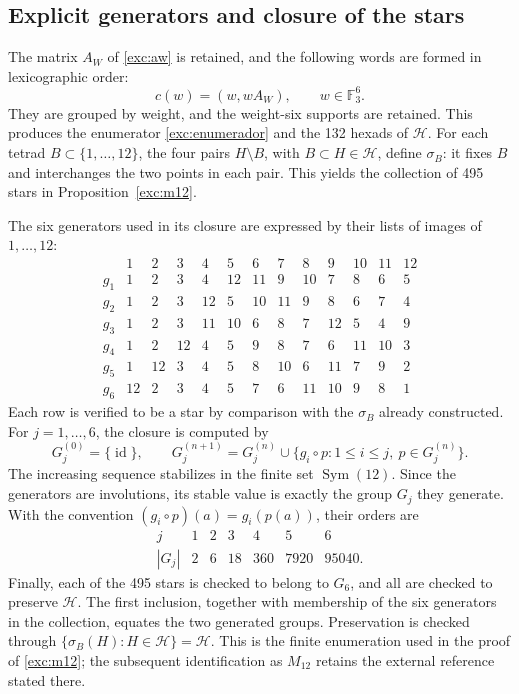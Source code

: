 \subsection{Explicit generators and closure of the stars}
\label{iv:apendice-estrellas}

The matrix \(A_W\) of \eqref{exc:aw} is retained, and the following words
are formed in lexicographic order:
\[
 c(w)=(w,wA_W),\qquad w\in\mathbb F_3^6.
\]
They are grouped by weight, and the weight-six supports are retained.
This produces the enumerator \eqref{exc:enumerador} and the 132 hexads
of \(\mathcal H\). For each tetrad \(B\subset\{1,\ldots,12\}\),
the four pairs \(H\setminus B\), with \(B\subset H\in\mathcal H\),
define \(\sigma_B\): it fixes \(B\) and interchanges the two points
in each pair. This yields the collection of 495 stars in
Proposition~\ref{exc:m12}.

The six generators used in its closure are expressed by their lists
of images of \(1,\ldots,12\):
\[
\begin{array}{c|rrrrrrrrrrrr}
 &1&2&3&4&5&6&7&8&9&10&11&12\\ \hline
g_1&1&2&3&4&12&11&9&10&7&8&6&5\\
g_2&1&2&3&12&5&10&11&9&8&6&7&4\\
g_3&1&2&3&11&10&6&8&7&12&5&4&9\\
g_4&1&2&12&4&5&9&8&7&6&11&10&3\\
g_5&1&12&3&4&5&8&10&6&11&7&9&2\\
g_6&12&2&3&4&5&7&6&11&10&9&8&1
\end{array}
\]
Each row is verified to be a star by comparison with the
\(\sigma_B\) already constructed. For \(j=1,\ldots,6\), the closure
is computed by
\[
 G_j^{(0)}=\{\operatorname{id}\},\qquad
 G_j^{(n+1)}
 =G_j^{(n)}\cup
   \{g_i\circ p:1\leq i\leq j,\ p\in G_j^{(n)}\}.
\]
The increasing sequence stabilizes in the finite set
\(\operatorname{Sym}(12)\). Since the generators are involutions,
its stable value is exactly the group \(G_j\) they generate.
With the convention \((g_i\circ p)(a)=g_i(p(a))\), their orders are
\[
\begin{array}{c|rrrrrr}
 j&1&2&3&4&5&6\\ \hline
 |G_j|&2&6&18&360&7920&95040 .
\end{array}
\]
Finally, each of the 495 stars is checked to belong to \(G_6\),
and all are checked to preserve \(\mathcal H\). The first inclusion,
together with membership of the six generators in the collection,
equates the two generated groups. Preservation is checked through
\(\{\sigma_B(H):H\in\mathcal H\}=\mathcal H\).
This is the finite enumeration used in the proof of
\ref{exc:m12}; the subsequent identification as \(M_{12}\)
retains the external reference stated there.
